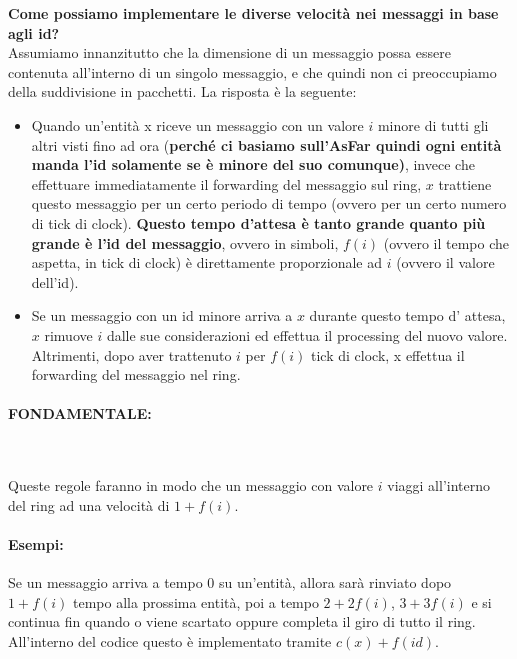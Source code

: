 \textbf{Come possiamo implementare le diverse velocità nei messaggi
    in base agli id?}\\
Assumiamo innanzitutto che la dimensione di un messaggio possa essere contenuta
all'interno di un singolo messaggio, e che quindi non ci preoccupiamo della
suddivisione in pacchetti. La risposta è la seguente:
\begin{itemize}
    \item Quando un'entità x riceve un messaggio con un valore $i$ minore di tutti
          gli altri visti fino ad ora (\textbf{perché ci basiamo sull'AsFar quindi ogni
              entità manda l'id solamente se è minore del suo comunque)}, invece che
          effettuare immediatamente il forwarding del messaggio sul ring, $x$ trattiene
          questo messaggio per un certo periodo di tempo (ovvero per un certo numero di
          tick di clock). \textbf{Questo tempo d'attesa è tanto grande quanto più grande
              è l'id del messaggio}, ovvero in simboli, $f(i)$ (ovvero il tempo che aspetta,
          in tick di clock) è direttamente proporzionale ad $i$ (ovvero il valore
          dell'id).
    \item Se un messaggio con un id minore arriva a $x$ durante questo tempo d'
          attesa, $x$ rimuove $i$ dalle sue considerazioni ed effettua il processing del
          nuovo valore. Altrimenti, dopo aver trattenuto $i$ per $f(i)$ tick di clock, x
          effettua il forwarding del messaggio nel ring.
\end{itemize}

\paragraph{FONDAMENTALE:}\ \\
\begin{center}
    Queste regole faranno in modo che un messaggio con valore $i$ viaggi
    all'interno del ring ad una velocità di $1+f(i)$.
\end{center}

\paragraph{Esempi:} Se un messaggio arriva a tempo $0$ su un'entità, allora sarà
rinviato dopo $1+f(i)$ tempo alla prossima entità, poi a tempo $2+2f(i)$,
$3+3f(i)$ e si continua fin quando o viene scartato oppure completa il giro di
tutto il ring. All'interno del codice questo è implementato tramite
$c(x)+f(id).$

